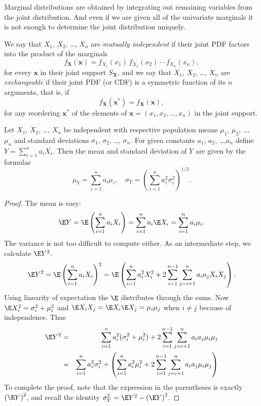 \documentclass[captions=tableheading]{scrbook}
\begin{document}
Marginal distributions are obtained by integrating out remaining variables from the joint distribution. And even if we are given all of the univariate marginals it is not enough to determine the joint distribution uniquely.

We say that \(X_{1}\), \(X_{2}\), \ldots{}, \(X_{n}\) are \emph{mutually independent} if their joint PDF factors into the product of the marginals
\begin{equation}
f_{\mathbf{X}}(\mathbf{x})=f_{X_{1}}(x_{1})\, f_{X_{2}}(x_{2})\,\cdots\, f_{X_{n}}(x_{n}),
\end{equation}
for every \(\mathbf{x}\) in their joint support \(S_{\mathbf{X}}\), and we say that \(X_{1}\), \(X_{2}\), \ldots{}, \(X_{n}\) are \emph{exchangeable} if their joint PDF (or CDF) is a symmetric function of its \(n\) arguments, that is, if 
\begin{equation}
f_{\mathbf{X}}(\mathbf{x^{\ast}})=f_{\mathbf{X}}(\mathbf{x}),
\end{equation}
for any reordering \(\mathbf{x^{\ast}}\) of the elements of \(\mathbf{x}=(x_{1},x_{2},\ldots,x_{n})\) in the joint support.

\begin{prop}
\label{pro:mean-sd-lin-comb}
Let \(X_{1}\), \(X_{2}\), \ldots{}, \(X_{n}\) be independent with respective population means \(\mu_{1}\), \(\mu_{2}\), \ldots{}, \(\mu_{n}\) and standard deviations \(\sigma_{1}\), \(\sigma_{2}\), \ldots{}, \(\sigma_{n}\). For given constants \(a_{1}\), \(a_{2}\), \ldots{},\(a_{n}\) define \(Y=\sum_{i=1}^{n}a_{i}X_{i}\). Then the mean and standard deviation of \(Y\) are given by the formulas
\begin{equation}
\mu_{Y}=\sum_{i=1}^{n}a_{i}\mu_{i},\quad\sigma_{Y}=\left(\sum_{i=1}^{n}a_{i}^{2}\sigma_{i}^{2}\right)^{1/2}.
\end{equation}
\end{prop}

\begin{proof}
The mean is easy:
\[
\E Y=\E\left(\sum_{i=1}^{n}a_{i}X_{i}\right)=\sum_{i=1}^{n}a_{i}\E X_{i}=\sum_{i=1}^{n}a_{i}\mu_{i}.
\]
The variance is not too difficult to compute either. As an intermediate step, we calculate \(\E Y^{2}\). 
\[
\E Y^{2}=\E\left(\sum_{i=1}^{n}a_{i}X_{i}\right)^{2}=\E\left(\sum_{i=1}^{n}a_{i}^{2}X_{i}^{2}+2\sum_{i=1}^{n-1}\sum_{j=i+1}^{n}a_{i}a_{j}X_{i}X_{j}\right).
\]
Using linearity of expectation the \(\E\) distributes through the sums. Now \(\E X_{i}^{2}=\sigma_{i}^{2}+\mu_{i}^{2}\) and \(\E X_{i}X_{j}=\E X_{i}\E X_{j}=\mu_{i}\mu_{j}\) when \(i\neq j\) because of independence. Thus
\begin{eqnarray*}
\E Y^{2} & = & \sum_{i=1}^{n}a_{i}^{2}(\sigma_{i}^{2}+\mu_{i}^{2})+2\sum_{i=1}^{n-1}\sum_{j=i+1}^{n}a_{i}a_{j}\mu_{i}\mu_{j}\\
 & = & \sum_{i=1}^{n}a_{i}^{2}\sigma_{i}^{2}+\left(\sum_{i=1}^{n}a_{i}^{2}\mu_{i}^{2}+2\sum_{i=1}^{n-1}\sum_{j=i+1}^{n}a_{i}a_{j}\mu_{i}\mu_{j}\right)
\end{eqnarray*}
To complete the proof, note that the expression in the parentheses is exactly \(\left(\E Y\right)^{2}\), and recall the identity \(\sigma_{Y}^{2}=\E Y^{2}-\left(\E Y\right)^{2}\).  
\end{proof}
\end{document}
